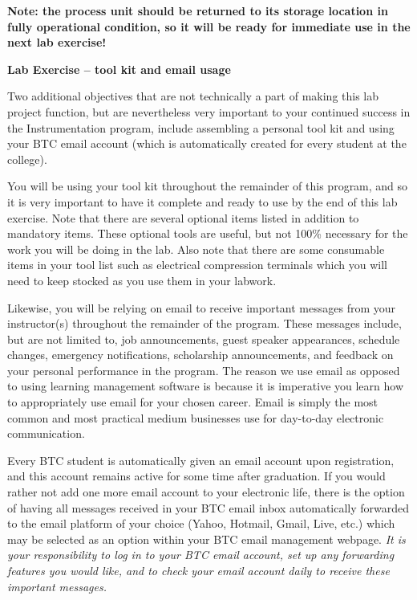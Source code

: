 {\bf Note: the process unit should be returned to its storage location in fully operational condition, so it will be ready for immediate use in the next lab exercise!}












\vfil \eject

\noindent
{\bf Lab Exercise -- tool kit and email usage}

\vskip 5pt

Two additional objectives that are not technically a part of making this lab project function, but are nevertheless very important to your continued success in the Instrumentation program, include assembling a personal tool kit and using your BTC email account (which is automatically created for every student at the college).  

\vskip 10pt

You will be using your tool kit throughout the remainder of this program, and so it is very important to have it complete and ready to use by the end of this lab exercise.  Note that there are several optional items listed in addition to mandatory items.  These optional tools are useful, but not 100\% necessary for the work you will be doing in the lab.  Also note that there are some consumable items in your tool list such as electrical compression terminals which you will need to keep stocked as you use them in your labwork.

\vskip 10pt

Likewise, you will be relying on email to receive important messages from your instructor(s) throughout the remainder of the program.  These messages include, but are not limited to, job announcements, guest speaker appearances, schedule changes, emergency notifications, scholarship announcements, and feedback on your personal performance in the program.  The reason we use email as opposed to using learning management software is because it is imperative you learn how to appropriately use email for your chosen career.  Email is simply the most common and most practical medium businesses use for day-to-day electronic communication.  

Every BTC student is automatically given an email account upon registration, and this account remains active for some time after graduation.  If you would rather not add one more email account to your electronic life, there is the option of having all messages received in your BTC email inbox automatically forwarded to the email platform of your choice (Yahoo, Hotmail, Gmail, Live, etc.) which may be selected as an option within your BTC email management webpage.  {\it It is your responsibility to log in to your BTC email account, set up any forwarding features you would like, and to check your email account daily to receive these important messages.}

